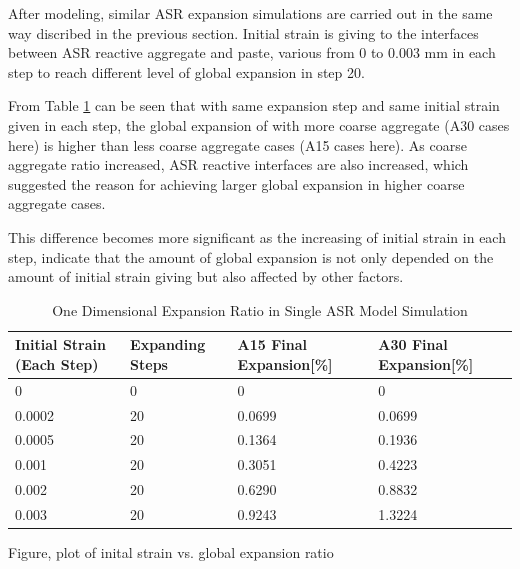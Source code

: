 After modeling, similar ASR expansion simulations are carried out in the same way discribed in the previous section. Initial strain is giving to the interfaces between ASR reactive aggregate and paste, various from 0 to 0.003 mm in each step to reach different level of global expansion in step 20.


From Table \ref{table:ASR_15vs30_EXPdffff} can be seen that with same expansion step and same initial strain given in each step, the global expansion of with more coarse aggregate (A30 cases here) is higher than less coarse aggregate cases (A15 cases here).  As coarse aggregate ratio increased, ASR reactive interfaces are also increased, which suggested the reason for achieving larger global expansion in higher coarse aggregate cases.

This difference becomes more significant as the increasing of initial strain in each step, indicate that the amount of global expansion is not only depended on the amount of initial strain giving but also affected by other factors.


\begin{table}[ht!]
  \caption{One Dimensional Expansion Ratio in Single ASR Model Simulation}
\centering
\begin{tabular}{ ||p{2cm}|p{2cm}|p{2cm}|p{2cm}|| }
 \hline
    Initial Strain (Each Step) & Expanding Steps & A15 Final Expansion[\%] & A30 Final Expansion[\%] \\ [0.5ex]
 \hline\hline
  0 & 0 & 0 & 0 \\
  0.0002 & 20 & 0.0699 & 0.0699\\
  0.0005 & 20 & 0.1364 & 0.1936\\
  0.001 & 20 & 0.3051 & 0.4223\\
  0.002 & 20 & 0.6290 & 0.8832\\
  0.003 & 20 & 0.9243 & 1.3224\\
 \hline
\end{tabular}

\label{table:ASR_15vs30_EXPdffff}
\end{table}

Figure, plot of inital strain vs. global expansion ratio

